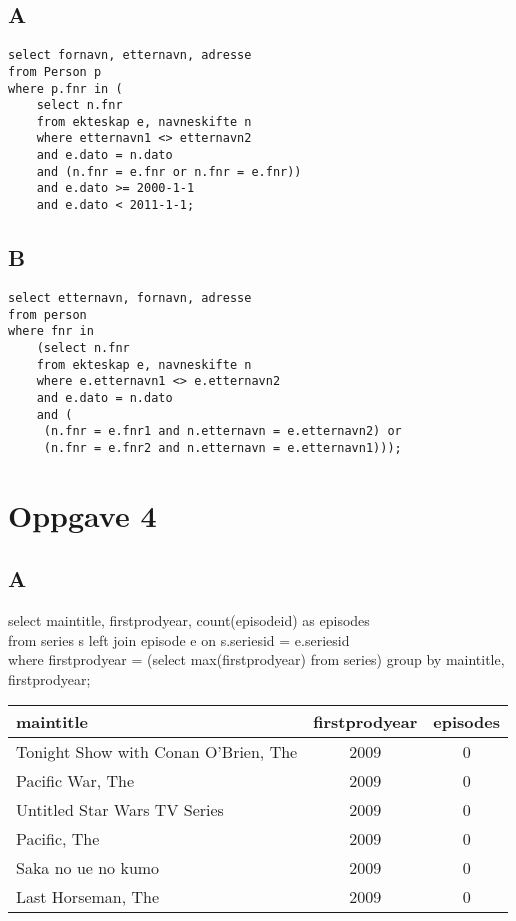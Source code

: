 \documentclass[12pt,norsk,a4paper]{article}
\begin{document}
\subsection*{A}
\begin{lstlisting}
select fornavn, etternavn, adresse 
from Person p
where p.fnr in (
	select n.fnr
	from ekteskap e, navneskifte n
	where etternavn1 <> etternavn2
	and e.dato = n.dato
	and (n.fnr = e.fnr or n.fnr = e.fnr))
	and e.dato >= 2000-1-1
	and e.dato < 2011-1-1;
\end{lstlisting}

\subsection*{B}
\begin{lstlisting}
select etternavn, fornavn, adresse
from person
where fnr in
	(select n.fnr
	from ekteskap e, navneskifte n
	where e.etternavn1 <> e.etternavn2 
	and e.dato = n.dato 
	and (
	 (n.fnr = e.fnr1 and n.etternavn = e.etternavn2) or
	 (n.fnr = e.fnr2 and n.etternavn = e.etternavn1)));
\end{lstlisting}

\section*{Oppgave 4}

\subsection*{A}
select maintitle, firstprodyear, count(episodeid) as episodes \\
from series s left join episode e on s.seriesid = e.seriesid \\
where firstprodyear = (select max(firstprodyear) from series) group by maintitle, firstprodyear;\\

\begin{tabular}{l | c | c}
maintitle & firstprodyear & episodes \\
\hline
 Tonight Show with Conan O'Brien, The & 2009 & 0\\
 Pacific War, The & 2009 & 0\\
 Untitled Star Wars TV Series & 2009 & 0\\
 Pacific, The & 2009 & 0\\
 Saka no ue no kumo & 2009 & 0\\
 Last Horseman, The & 2009 & 0\\
\end{tabular}
\end{document}
